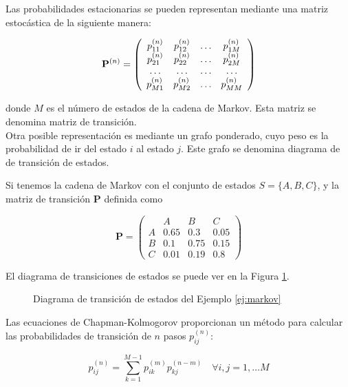 Las probabilidades estacionarias se pueden representan mediante una matriz estocástica de la siguiente manera:

\[ \mathbf{P}^{(n)} = \left(\begin{array}{c c c c}
p_{11}^{(n)} & p_{12}^{(n)} & \dots & p_{1M}^{(n)}\\
p_{21}^{(n)} & p_{22}^{(n)} & \dots & p_{2M}^{(n)}\\
\dots        & \dots        & \dots & \dots\\
p_{M1}^{(n)} & p_{M2}^{(n)} & \dots & p_{MM}^{(n)}  
\end{array}\right) \]

donde $M$ es el número de estados de la cadena de Markov. Esta matriz se denomina matriz de transición.\\

Otra posible representación es mediante un grafo ponderado, cuyo peso es la probabilidad de ir del estado $i$ al estado $j$. Este grafo se denomina diagrama de  de transición de estados.

\begin{ejemplo} \label{ej:markov}
Si tenemos la cadena de Markov con el conjunto de estados $S = \{A,B,C\}$, y la matriz de transición $\mathbf{P}$ definida como

\[ \mathbf{P} = \left(\begin{array}{cccc}
  &   A  &   B  &  C \\
A & 0.65 & 0.3  & 0.05\\
B & 0.1  & 0.75 & 0.15\\
C & 0.01 & 0.19 & 0.8
\end{array}\right) \] 

El diagrama de transiciones de estados se puede ver en la Figura \ref{fig:markov}.

\begin{figure}[htb]
\centering
\ejemplomarkov
\caption{Diagrama de transición de estados del Ejemplo \ref{ej:markov}}
\label{fig:markov}
\end{figure}
\end{ejemplo}

Las ecuaciones de Chapman-Kolmogorov proporcionan un método para calcular las probabilidades de transición de $n$ pasos $p_{ij}^{(n)}$:

\begin{equation}
p_{ij}^{(n)} = \sum\limits_{k=1}^{M-1} p_{ik}^{(m)}p_{kj}^{(n-m)} \quad \forall i,j = 1,\dots M
\end{equation}

